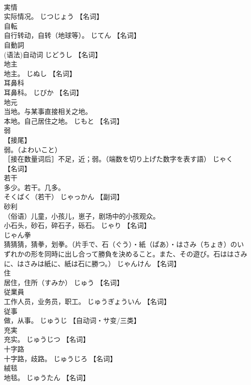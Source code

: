 \documentclass[8pt]{extreport}
\begin{document}
\begin{CJK}{UTF8}{min}
\\	実情	
\\	实际情况。	じつじょう		【名词】
\\	自転	
\\	自行转动，自转（地球等）。	じてん		【名词】
\\	自動詞	
\\	(语法)自动词	じどうし		【名词】
\\	地主	
\\	地主。	じぬし		【名词】
\\	耳鼻科	
\\	耳鼻科。	じびか		【名词】
\\	地元	
\\	当地。与某事直接相关之地。 
\\	本地。自己居住之地。	じもと		【名词】
\\	弱	
\\	【接尾】 
\\	弱。（よわいこと） 
\\	［接在数量词后］不足，近；弱。（端数を切り上げた数字を表す語）	じゃく		【名词】
\\	若干	
\\	多少。若干。几多。 
\\	そくばく（若干）	じゃっかん		【副词】
\\	砂利	
\\	（俗语）儿童，小孩儿，崽子，剧场中的小孩观众。 
\\	小石头，砂石，碎石子，砾石。	じゃり		【名词】
\\	じゃん拳	
\\	猜猜猜，猜拳，划拳。（片手で、石（ぐう）・紙（ぱあ）・はさみ（ちょき）のいずれかの形を同時に出し合って勝負を決めること。また、その遊び。石ははさみに、はさみは紙に、紙は石に勝つ。）	じゃんけん		【名词】
\\	住	
\\	居住，住所（すみか）	じゅう		【名词】
\\	従業員	
\\	工作人员，业务员，职工。	じゅうぎょういん		【名词】
\\	従事	
\\	做，从事。	じゅうじ		【自动词・サ变/三类】
\\	充実	
\\	充实。	じゅうじつ		【名词】
\\	十字路	
\\	十字路，歧路。	じゅうじろ		【名词】
\\	絨毯	
\\	地毯。	じゅうたん		【名词】

\end{CJK}
\end{document}
